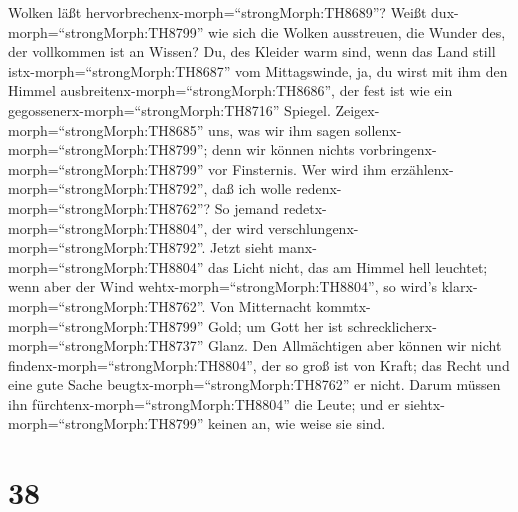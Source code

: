 Wolken läßt hervorbrechenx-morph=``strongMorph:TH8689''? 
Weißt dux-morph=``strongMorph:TH8799'' wie sich die Wolken ausstreuen,
die Wunder des, der vollkommen ist an Wissen?  Du, des
Kleider warm sind, wenn das Land still istx-morph=``strongMorph:TH8687''
vom Mittagswinde,  ja, du wirst mit ihm den Himmel
ausbreitenx-morph=``strongMorph:TH8686'', der fest ist wie ein
gegossenerx-morph=``strongMorph:TH8716'' Spiegel. 
Zeigex-morph=``strongMorph:TH8685'' uns, was wir ihm sagen
sollenx-morph=``strongMorph:TH8799''; denn wir können nichts
vorbringenx-morph=``strongMorph:TH8799'' vor Finsternis. 
Wer wird ihm erzählenx-morph=``strongMorph:TH8792'', daß ich wolle
redenx-morph=``strongMorph:TH8762''? So jemand
redetx-morph=``strongMorph:TH8804'', der wird
verschlungenx-morph=``strongMorph:TH8792''.  Jetzt sieht
manx-morph=``strongMorph:TH8804'' das Licht nicht, das am Himmel hell
leuchtet; wenn aber der Wind wehtx-morph=``strongMorph:TH8804'', so
wird's klarx-morph=``strongMorph:TH8762''.  Von Mitternacht
kommtx-morph=``strongMorph:TH8799'' Gold; um Gott her ist
schrecklicherx-morph=``strongMorph:TH8737'' Glanz.  Den
Allmächtigen aber können wir nicht findenx-morph=``strongMorph:TH8804'',
der so groß ist von Kraft; das Recht und eine gute Sache
beugtx-morph=``strongMorph:TH8762'' er nicht.  Darum müssen
ihn fürchtenx-morph=``strongMorph:TH8804'' die Leute; und er
siehtx-morph=``strongMorph:TH8799'' keinen an, wie weise sie sind.

\hypertarget{section-37}{%
\section{38}\label{section-37}}

